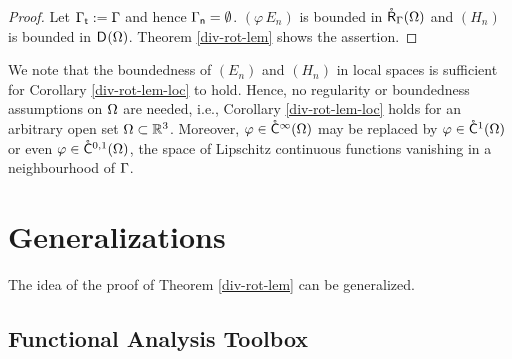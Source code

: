 \documentclass[a4paper]{amsart}
\newcommand{\ccq}[2]{\mathring\csymbol^{#1}_{#2}}
\newcommand{\ccqom}[2]{\ccq{#1}{#2}(\om)}
\begin{document}
\begin{proof}
Let $\Gamma_{\mathsf{t}}:=\Gamma$ and hence $\Gamma_{\mathsf{n}}=\emptyset$.
$(\varphi\,E_{n})$ is bounded in $\mathring{\mathsf{R}}_{\Gamma}(\Omega)$
and $(H_{n})$ is bounded in $\overset{}{\mathsf{D}}{}^{}_{}(\Omega)$.
Theorem \ref{div-rot-lem} shows the assertion.
\end{proof}

\begin{rem}
We note that the boundedness of $(E_{n})$ and $(H_{n})$ 
in local spaces is sufficient for Corollary \ref{div-rot-lem-loc} to hold.
Hence, no regularity or boundedness assumptions on $\Omega$ are needed, i.e.,
Corollary \ref{div-rot-lem-loc} holds for an arbitrary open set $\Omega\subset\mathbb{R}^{3}$.
Moreover, $\varphi\in\mathring{\mathsf{C}}^{\infty}(\Omega)$ may be replaced by $\varphi\in\ccqom{1}{}$ or even $\varphi\in\ccqom{0,1}{}$,
the space of Lipschitz continuous functions vanishing in a neighbourhood of $\Gamma$.
\end{rem}

\section{Generalizations}

The idea of the proof of Theorem \ref{div-rot-lem} can be generalized.

\subsection{Functional Analysis Toolbox}
\end{document}
